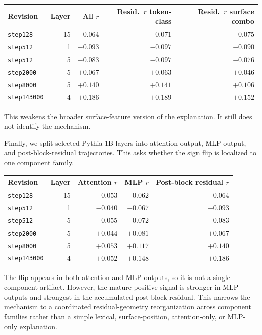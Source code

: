 \documentclass[11pt,letterpaper]{article}
\begin{document}
\begin{center}
\begin{tabular}{lrrrr}
\toprule
\textbf{Revision} & \textbf{Layer} & \textbf{All $r$} & \textbf{Resid.\ $r$ token-class} & \textbf{Resid.\ $r$ surface combo} \\
\midrule
\texttt{step128}    & 15 & $-0.064$ & $-0.071$ & $-0.075$ \\
\texttt{step512}    &  1 & $-0.093$ & $-0.097$ & $-0.090$ \\
\texttt{step512}    &  5 & $-0.083$ & $-0.097$ & $-0.076$ \\
\texttt{step2000}   &  5 & $+0.067$ & $+0.063$ & $+0.046$ \\
\texttt{step8000}   &  5 & $+0.140$ & $+0.141$ & $+0.106$ \\
\texttt{step143000} &  4 & $+0.186$ & $+0.189$ & $+0.152$ \\
\bottomrule
\end{tabular}
\end{center}

This weakens the broader surface-feature version of the explanation.
It still does not identify the mechanism.

Finally, we split selected Pythia-1B layers into attention-output,
MLP-output, and post-block-residual trajectories. This asks whether the
sign flip is localized to one component family.

\begin{center}
\begin{tabular}{lrrrr}
\toprule
\textbf{Revision} & \textbf{Layer} & \textbf{Attention $r$} & \textbf{MLP $r$} & \textbf{Post-block residual $r$} \\
\midrule
\texttt{step128}    & 15 & $-0.053$ & $-0.062$ & $-0.064$ \\
\texttt{step512}    &  1 & $-0.040$ & $-0.067$ & $-0.093$ \\
\texttt{step512}    &  5 & $-0.055$ & $-0.072$ & $-0.083$ \\
\texttt{step2000}   &  5 & $+0.044$ & $+0.081$ & $+0.067$ \\
\texttt{step8000}   &  5 & $+0.053$ & $+0.117$ & $+0.140$ \\
\texttt{step143000} &  4 & $+0.052$ & $+0.148$ & $+0.186$ \\
\bottomrule
\end{tabular}
\end{center}

The flip appears in both attention and MLP outputs, so it is not a
single-component artifact. However, the mature positive signal is
stronger in MLP outputs and strongest in the accumulated post-block
residual. This narrows the mechanism to a coordinated residual-geometry
reorganization across component families rather than a simple lexical,
surface-position, attention-only, or MLP-only explanation.
\end{document}
